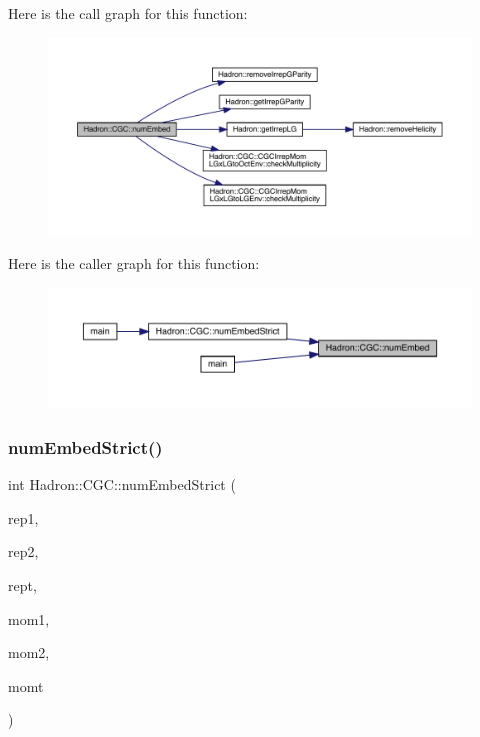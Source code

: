 Here is the call graph for this function\+:\nopagebreak
\begin{figure}[H]
\begin{center}
\leavevmode
\includegraphics[width=350pt]{d9/d19/namespaceHadron_1_1CGC_af727ac6be27b471bc40b4696c2a29cdb_cgraph}
\end{center}
\end{figure}
Here is the caller graph for this function\+:
\nopagebreak
\begin{figure}[H]
\begin{center}
\leavevmode
\includegraphics[width=350pt]{d9/d19/namespaceHadron_1_1CGC_af727ac6be27b471bc40b4696c2a29cdb_icgraph}
\end{center}
\end{figure}
\mbox{\label{namespaceHadron_1_1CGC_af5aac6c0d70eb7159aa635525bac7629}} 
\subsubsection{\texorpdfstring{numEmbedStrict()}{numEmbedStrict()}}
{\footnotesize\ttfamily int Hadron\+::\+C\+G\+C\+::num\+Embed\+Strict (\begin{DoxyParamCaption}\item[{const std\+::string \&}]{rep1,  }\item[{const std\+::string \&}]{rep2,  }\item[{const std\+::string \&}]{rept,  }\item[{const Array\+Int \&}]{mom1,  }\item[{const Array\+Int \&}]{mom2,  }\item[{const Array\+Int \&}]{momt }\end{DoxyParamCaption})}

